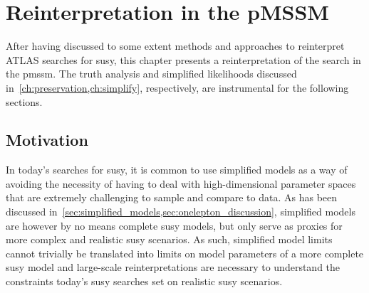 


\chapter{Reinterpretation in the pMSSM}\label{ch:pmssm}

\ifpdf
    \graphicspath{{chapter-pmssm/Figs/Raster/}{chapter-pmssm/Figs/PDF/}{chapter-pmssm/Figs/}}
\else
    \graphicspath{{chapter-pmssm/Figs/Vector/}{chapter-pmssm/Figs/}}
\fi

After having discussed to some extent methods and approaches to reinterpret ATLAS searches for \gls{susy}, this chapter presents a reinterpretation of the \onelepton search in the \gls{pmssm}. The truth analysis and simplified likelihoods discussed in~\cref{ch:preservation,ch:simplify}, respectively, are instrumental for the following sections. 

\section{Motivation}

In today's searches for \gls{susy}, it is common to use simplified models as a way of avoiding the necessity of having to deal with high-dimensional parameter spaces that are extremely challenging to sample and compare to data.
As has been discussed in~\cref{sec:simplified_models,sec:onelepton_discussion}, simplified models are however by no means complete \gls{susy} models, but only serve as proxies for more complex and realistic \gls{susy} scenarios. As such, simplified model limits cannot trivially be translated into limits on model parameters of a more complete \gls{susy} model and large-scale reinterpretations are necessary to understand the constraints today's \gls{susy} searches set on realistic \gls{susy} scenarios. 

